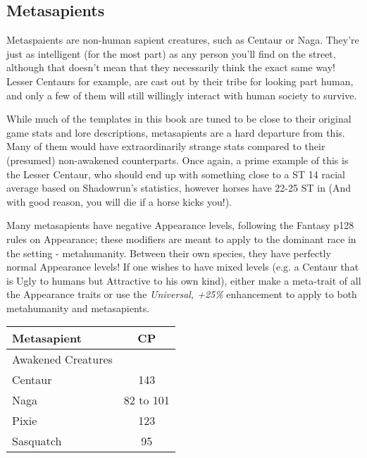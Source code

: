 \begin{multicols*}{3}
	\subsection{Metasapients}
	
	Metaspaients are non-human sapient creatures, such as Centaur or Naga. They're just as intelligent (for the most part) as any person you'll find on the street, although that doesn't mean that they necessarily think the exact same way! Lesser Centaurs for example, are cast out by their tribe for looking part human, and only a few of them will still willingly interact with human society to survive.
	
	While much of the templates in this book are tuned to be close to their original game stats and lore descriptions, metasapients are a hard departure from this. Many of them would have extraordinarily strange stats compared to their (presumed) non-awakened counterparts. Once again, a prime example of this is the Lesser Centaur, who should end up with something close to a ST 14 racial average based on Shadowrun's statistics, however horses have 22-25 ST in \GURPS (And with good reason, you will die if a horse kicks you!).
	
	Many metasapients have negative Appearance levels, following the Fantasy p128  rules on Appearance; these modifiers are meant to apply to the dominant race in the setting - metahumanity. Between their own species, they have perfectly normal Appearance levels! If one wishes to have mixed levels (e.g. a Centaur that is Ugly to humans but Attractive to his own kind), either make a meta-trait of all the Appearance traits or use the \textit{Universal, +25\%} enhancement to apply to both metahumanity and metasapients.
	
	\begin{center}
		\begin{tabularx}{0.32\textwidth}{|X|c|}
			\hline
			Metasapient & CP \\
			\hline
			\hline
			Awakened Creatures & \\
			\hline
			Centaur & 143 \\
			Naga & 82 to 101 \\
			Pixie & 123 \\
			Sasquatch & 95 \\
			\hline
		\end{tabularx}
	\end{center}
	

\end{multicols*}
